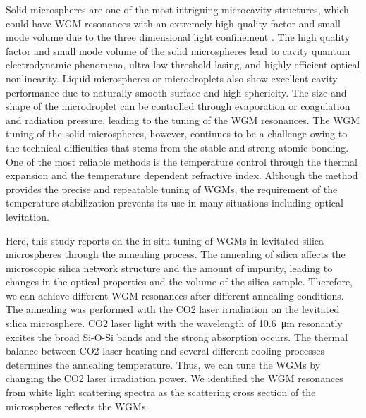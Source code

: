 \documentclass[aps,prl,preprint,groupedaddress]{revtex4-1}
\begin{document}
Solid microspheres are one of the most intriguing microcavity structures, which could have WGM resonances with an extremely high quality factor and small mode volume due to the three dimensional light confinement \cite{spillane_ultralow-threshold_2002}. The high quality factor and small mode volume of the solid microspheres lead to cavity quantum electrodynamic phenomena\cite{buck_optimal_2003}, ultra-low threshold lasing\cite{okamoto_fabrication_2014}, and highly efficient optical nonlinearity\cite{treussart_evidence_1998}. Liquid microspheres or microdroplets also show excellent cavity performance due to naturally smooth surface and high-sphericity\cite{kiraz_volume_2007,schafer_quantum_2008}. The size and shape of the microdroplet can be controlled through evaporation\cite{kiraz_volume_2007} or coagulation\cite{hopkins_control_2004} and radiation pressure\cite{aas_spectral_2013}, leading to the tuning of the WGM resonances. The WGM tuning of the solid microspheres, however, continues to be a challenge owing to the technical difficulties that stems from the stable and strong atomic bonding. One of the most reliable methods is the temperature control through the thermal expansion and the temperature dependent refractive index\cite{chiba_resonant_2004}. Although the method provides the precise and repeatable tuning of WGMs, the requirement of the temperature stabilization prevents its use in many situations including optical levitation. 

Here, this study reports on the in-situ tuning of WGMs in levitated silica microspheres through the annealing process. The annealing of silica affects the microscopic silica network structure and the amount of impurity, leading to changes in the optical properties and the volume of the silica sample\cite{kaiser_drawing-induced_1974,cho_stabilization_2014}. Therefore, we can achieve different WGM resonances after different annealing conditions. The annealing was performed with the CO2 laser irradiation on the levitated silica microsphere. CO2 laser light with the wavelength of \SI{10.6}{\micro \meter} resonantly excites the broad Si-O-Si bands and the strong absorption occurs. The thermal balance between CO2 laser heating and several different cooling processes determines the annealing temperature. Thus, we can tune the WGMs by changing the CO2 laser irradiation power. We identified the WGM resonances from white light scattering spectra as the scattering cross section of the microspheres reflects the WGMs\cite{bohren_absorption_1983, schietinger_coupling_2009}.                   
\end{document}
